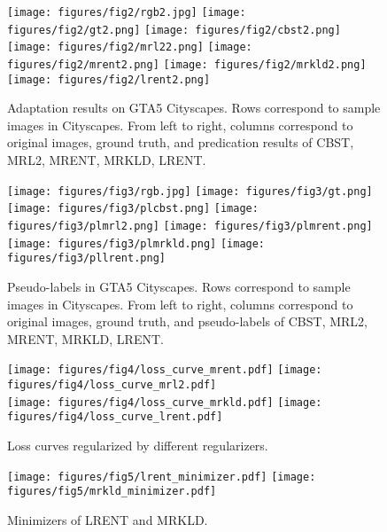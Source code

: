 \documentclass[10pt,twocolumn,letterpaper]{article}
\theoremstyle{plain}
\begin{document}
\begin{figure*}[!t]
	\texttt{[image: figures/fig2/rgb2.jpg]}
	\texttt{[image: figures/fig2/gt2.png]}
	\texttt{[image: figures/fig2/cbst2.png]}
	\texttt{[image: figures/fig2/mrl22.png]}
	\texttt{[image: figures/fig2/mrent2.png]}
	\texttt{[image: figures/fig2/mrkld2.png]}
	\texttt{[image: figures/fig2/lrent2.png]}\\
	\vspace{-2mm}
	\caption{Adaptation results on GTA5  Cityscapes. Rows correspond to sample images in Cityscapes. From left to right, columns correspond to original images, ground truth, and predication results of CBST, MRL2, MRENT, MRKLD, LRENT.}
	\label{fig:gta2city}
\end{figure*}

\begin{figure*}[!t]
	\centering
	\texttt{[image: figures/fig3/rgb.jpg]}
	\texttt{[image: figures/fig3/gt.png]}
	\texttt{[image: figures/fig3/plcbst.png]}
	\texttt{[image: figures/fig3/plmrl2.png]}
	\texttt{[image: figures/fig3/plmrent.png]}
	\texttt{[image: figures/fig3/plmrkld.png]}
	\texttt{[image: figures/fig3/pllrent.png]}\\
	\vspace{-2mm}
	\caption{Pseudo-labels in GTA5  Cityscapes. Rows correspond to sample images in Cityscapes. From left to right, columns correspond to original images, ground truth, and pseudo-labels of CBST, MRL2, MRENT, MRKLD, LRENT.}
	\label{fig:plgta2city}
\end{figure*}

\begin{figure}[t]
	\centering
	\texttt{[image: figures/fig4/loss\_curve\_mrent.pdf]}
	\texttt{[image: figures/fig4/loss\_curve\_mrl2.pdf]}\\
	\texttt{[image: figures/fig4/loss\_curve\_mrkld.pdf]}
	\texttt{[image: figures/fig4/loss\_curve\_lrent.pdf]}
	\vspace{-3mm}
	\caption{Loss curves regularized by different regularizers.}
	\label{fig:loss_curves}
	\vspace{-1mm}
\end{figure}

\begin{figure}[t]
	\centering
	\texttt{[image: figures/fig5/lrent\_minimizer.pdf]}
	\texttt{[image: figures/fig5/mrkld\_minimizer.pdf]}
	\vspace{-2mm}
	\caption{Minimizers of LRENT and MRKLD.}
	\label{fig:softmax_temp}
	\vspace{-3mm}
\end{figure}
\end{document}
